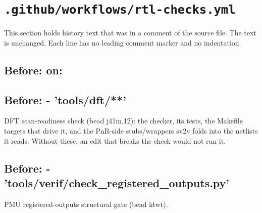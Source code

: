 \section{\texttt{.github/workflows/rtl-checks.yml}}\label{cr:flow:ci-rtl-checks}

This section holds history text that was in a comment of the source file. The text is unchanged. Each line has no leading comment marker and no indentation.

\begin{record}

\subsection*{Before: on:}


\subsection*{Before: - 'tools/dft/**'}

\begin{textblock}
DFT scan-readiness check (bead j41m.12): the checker, its tests, the Makefile
targets that drive it, and the PnR-side stubs/wrappers sv2v folds into the
netlists it reads. Without these, an edit that breaks the check would not run it.
\end{textblock}

\subsection*{Before: - 'tools/verif/check\_registered\_outputs.py'}

\begin{textblock}
PMU registered-outputs structural gate (bead ktwt).
\end{textblock}


\end{record}
